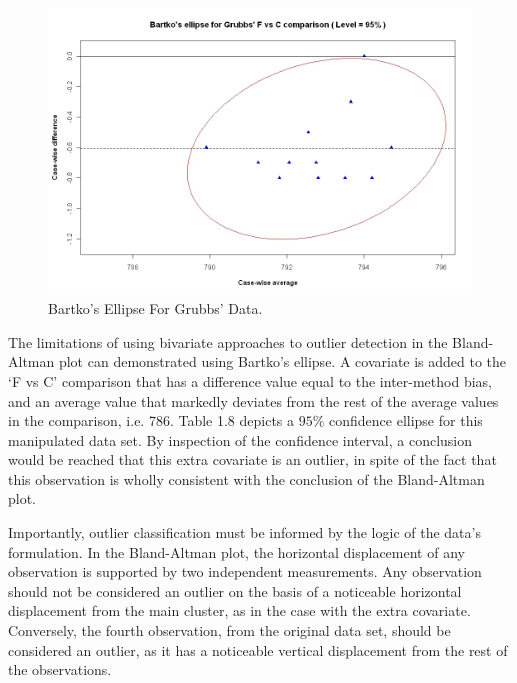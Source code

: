 \documentclass[12pt, a4paper]{report}
\theoremstyle{plain}
\theoremstyle{definition}
\theoremstyle{remark}
\begin{document}
		
		\begin{centering}
			\begin{figure}[h!]
				\includegraphics[width=130mm]{images/GrubbsBartko.jpeg}
				\caption{Bartko's Ellipse For Grubbs' Data.}
				\label{GrubbsBartko1}
			\end{figure}
		\end{centering}
		
		The limitations of using bivariate approaches to outlier detection
		in the Bland-Altman plot can demonstrated using Bartko's ellipse.
		A covariate is added to the `F vs C' comparison that has a
		difference value equal to the inter-method bias, and an average
		value that markedly deviates from the rest of the average values
		in the comparison, i.e. 786. Table 1.8 depicts a $95\%$ confidence
		ellipse for this manipulated data set. By inspection of the
		confidence interval, a conclusion would be reached that this extra
		covariate is an outlier, in spite of the fact that this
		observation is wholly consistent with the conclusion of the
		Bland-Altman plot.
		
		
		
		Importantly, outlier classification must be informed by the logic of the
		data's formulation. In the Bland-Altman plot, the horizontal displacement of any
		observation is supported by two independent measurements. Any
		observation should not be considered an outlier on the basis of a
		noticeable horizontal displacement from the main cluster, as in
		the case with the extra covariate. Conversely, the fourth
		observation, from the original data set, should be considered an
		outlier, as it has a noticeable vertical displacement from the
		rest of the observations.
		\newpage
		
\end{document}
